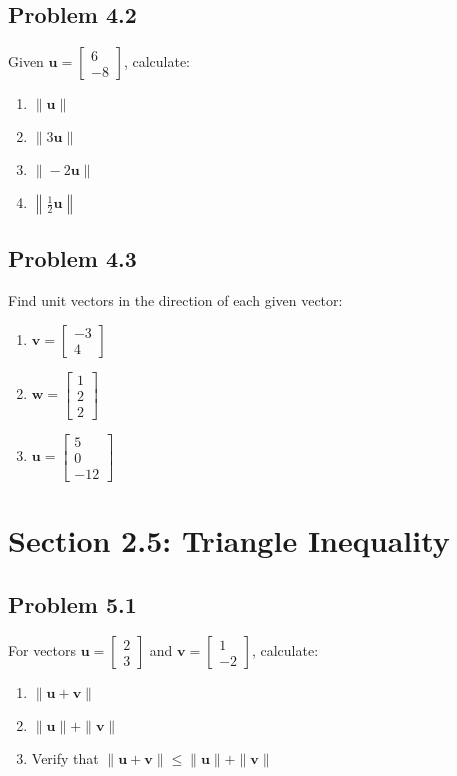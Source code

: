 \documentclass{article}
\begin{document}
\subsection{Problem 4.2}
Given $\mathbf{u} = \begin{bmatrix} 6 \\ -8 \end{bmatrix}$, calculate:
\begin{enumerate}
\item $\|\mathbf{u}\|$
\item $\|3\mathbf{u}\|$
\item $\|-2\mathbf{u}\|$
\item $\left\|\frac{1}{2}\mathbf{u}\right\|$
\end{enumerate}

\subsection{Problem 4.3}
Find unit vectors in the direction of each given vector:
\begin{enumerate}
\item $\mathbf{v} = \begin{bmatrix} -3 \\ 4 \end{bmatrix}$
\item $\mathbf{w} = \begin{bmatrix} 1 \\ 2 \\ 2 \end{bmatrix}$
\item $\mathbf{u} = \begin{bmatrix} 5 \\ 0 \\ -12 \end{bmatrix}$
\end{enumerate}

\section{Section 2.5: Triangle Inequality}

\subsection{Problem 5.1}
For vectors $\mathbf{u} = \begin{bmatrix} 2 \\ 3 \end{bmatrix}$ and $\mathbf{v} = \begin{bmatrix} 1 \\ -2 \end{bmatrix}$, calculate:
\begin{enumerate}
\item $\|\mathbf{u} + \mathbf{v}\|$
\item $\|\mathbf{u}\| + \|\mathbf{v}\|$
\item Verify that $\|\mathbf{u} + \mathbf{v}\| \leq \|\mathbf{u}\| + \|\mathbf{v}\|$
\end{enumerate}
\end{document}
